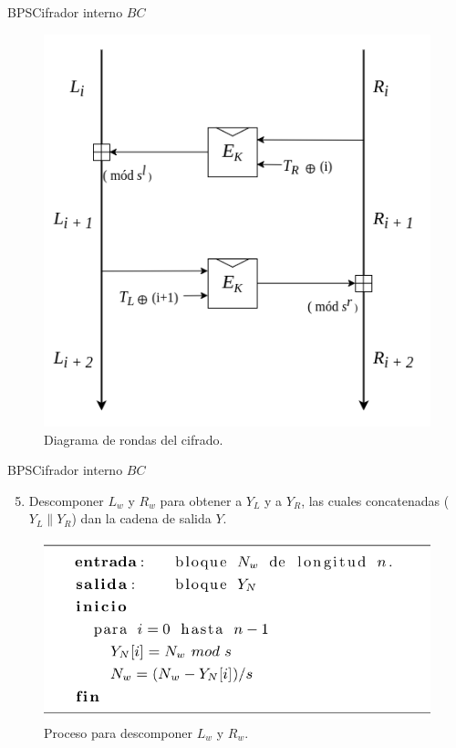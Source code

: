 \begin{frame}{BPS}{Cifrador interno $BC$}

  \begin{figure}[H]
    \begin{center}
      \includegraphics[width=0.6\linewidth]
        {../../../diagramas_comunes/bps/cifrado_bc}
      \caption{Diagrama de rondas del cifrado.}
     \end{center}
  \end{figure}

\end{frame}

\begin{frame}{BPS}{Cifrador interno $BC$}

  \begin{enumerate}
    \setcounter{enumi}{4}
    \item Descomponer $L_w$ y $R_w$ para obtener a $Y_L$ y a $Y_R$, las
      cuales concatenadas ($Y_L \parallel Y_R$) dan la cadena de salida $Y$.
  \end{enumerate}

    \begin{figure}[H]
      \begin{center}
        \includegraphics[width=0.75\linewidth]
          {../../../diagramas_comunes/bps/descomposicion}
        \caption{Proceso para descomponer $L_w$ y $R_w$.}
       \end{center}
    \end{figure}

\end{frame}

